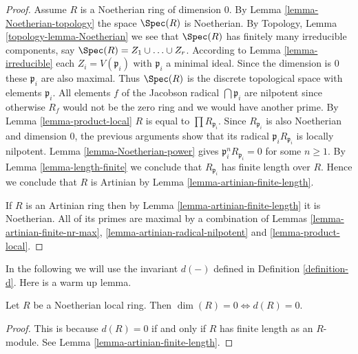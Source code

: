 \begin{proof}
Assume $R$ is a Noetherian ring of dimension $0$.
By Lemma \ref{lemma-Noetherian-topology} the space $\Spec(R)$
is Noetherian. By Topology, Lemma \ref{topology-lemma-Noetherian} we see
that $\Spec(R)$ has finitely many irreducible
components, say $\Spec(R) = Z_1 \cup \ldots \cup Z_r$.
According to Lemma \ref{lemma-irreducible} each $Z_i = V(\mathfrak p_i)$
with $\mathfrak p_i$ a minimal ideal. Since the dimension is $0$
these $\mathfrak p_i$ are also maximal. Thus $\Spec(R)$
is the discrete topological space with elements $\mathfrak p_i$.
All elements $f$ of the Jacobson radical $\bigcap \mathfrak p_i$
are nilpotent since otherwise $R_f$ would not be the zero ring
and we would have another prime.
By Lemma \ref{lemma-product-local} $R$ is equal to
$\prod R_{\mathfrak p_i}$. Since $R_{\mathfrak p_i}$
is also Noetherian and dimension $0$, the previous arguments
show that its radical $\mathfrak p_iR_{\mathfrak p_i}$ is locally nilpotent.
Lemma \ref{lemma-Noetherian-power} gives
$\mathfrak p_i^nR_{\mathfrak p_i} = 0$ for some $n \geq 1$.
By Lemma \ref{lemma-length-finite} we conclude that $R_{\mathfrak p_i}$
has finite length over $R$. Hence we conclude that $R$
is Artinian by Lemma \ref{lemma-artinian-finite-length}.

\medskip\noindent
If $R$ is an Artinian ring then by Lemma \ref{lemma-artinian-finite-length}
it is Noetherian. All of its primes are maximal by a combination
of Lemmas \ref{lemma-artinian-finite-nr-max},
\ref{lemma-artinian-radical-nilpotent} and \ref{lemma-product-local}.
\end{proof}

\noindent
In the following we will use the invariant $d(-)$ defined
in Definition \ref{definition-d}. Here is a warm up lemma.

\begin{lemma}
\label{lemma-dimension-0-d-0}
Let $R$ be a Noetherian local ring.
Then $\dim(R) = 0 \Leftrightarrow d(R) = 0$.
\end{lemma}

\begin{proof}
This is because $d(R) = 0$ if and only if $R$ has finite
length as an $R$-module. See Lemma \ref{lemma-artinian-finite-length}.
\end{proof}


